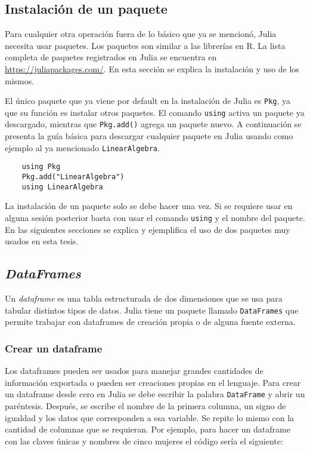 \subsection{Instalación de un paquete} \label{instalacion_paquete}


Para cualquier otra operación fuera de lo básico que ya se mencionó, \textsf{Julia} necesita usar paquetes. Los paquetes son similar a las librerías en \textsf{R}. La lista completa de paquetes registrados en \textsf{Julia} se encuentra en \url{https://juliapackages.com/}. En esta sección se explica la instalación y uso de los mismos. 

El único paquete que ya viene por default en la instalación de \textsf{Julia} es \texttt{Pkg}, ya que su función es instalar otros paquetes. El comando \texttt{using} activa un paquete ya descargado, mientras que \texttt{Pkg.add()} agrega un paquete nuevo. A continuación se presenta la guía básica para descargar cualquier paquete en \textsf{Julia} usando como ejemplo al ya mencionado \texttt{LinearAlgebra}. 


\begin{verbatim}
	using Pkg
	Pkg.add("LinearAlgebra")
	using LinearAlgebra
\end{verbatim}

La instalación de un paquete solo se debe hacer una vez. Si se requiere usar en alguna sesión posterior basta con usar el comando \texttt{using} y el nombre del paquete. En las siguientes secciones se explica y ejemplifica el uso de dos paquetes muy usados en esta tesis. 

\subsection{\textit{DataFrames}}

Un \textit{dataframe} es una tabla estructurada de dos dimensiones que se usa para tabular distintos tipos de datos. \textsf{Julia} tiene un paquete llamado \texttt{DataFrames} que permite trabajar con dataframes de creación propia o de alguna fuente externa. 

\subsubsection{Crear un dataframe}

Los dataframes pueden ser usados para manejar grandes cantidades de información exportada o pueden ser creaciones propias en el lenguaje. Para crear un dataframe desde cero en \textsf{Julia} se debe escribir la palabra \texttt{DataFrame} y abrir un paréntesis. Después, se escribe el nombre de la primera columna, un signo de igualdad y los datos que corresponden a esa variable. Se repite lo mismo con la cantidad de columnas que se requieran. Por ejemplo, para hacer un dataframe con las claves únicas y nombres de cinco mujeres el código sería el siguiente: 


